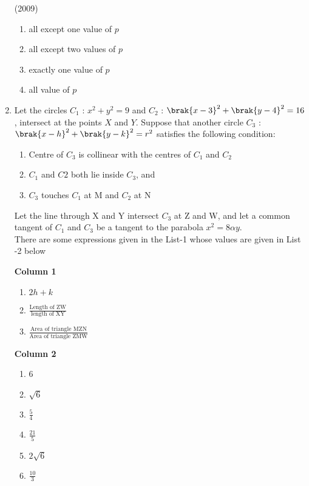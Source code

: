 \begin{enumerate}
\hfill{(2009)}
\begin{enumerate}
\item all except one value of $p$
\item all except two values of $p$
\item exactly one value of $p$
\item all value of $p$
\end{enumerate}
    \item Let the circles $C_{1}$ : $x^2+y^2=9$ and $C_{2}$ : $\brak{x-3}^2+\brak{y-4}^2 = 16$, intersect at the points $X$ and $Y$. Suppose that another circle $C_{3}$ : $\brak{x-h}^2+\brak{y-k}^2=r^2$ satisfies the following condition:\\
 
 
 \begin{enumerate}[label=(\roman*)]
 \item Centre of $C_{3}$ is collinear with the centres of $C_{1}$ and $C_{2}$
 \item $C_{1}$ and $C{2}$ both lie inside $C_{3}$, and

 \item $C_{3}$ touches $C_{1}$ at M and $C_{2}$ at N
\end{enumerate}
Let the line through X and Y intersect $C_{3}$ at Z and W, and let a common tangent of $C_{1}$ and $C_{3}$ be a tangent to the parabola $x^2=8\alpha y.$\\

There are some expressions given in the List-1 whose values are given in List -2 below
\newpage
			
\begin{multicols}{2}
\textbf{Column 1}
\begin{enumerate}[label=(\Alph*)]           
\item $2h+k$                                  
\item $\frac{\text{Length of ZW}}{\text{length of XY}}$     
\item $\frac{\text{Area of triangle MZN}}{\text{Area of triangle ZMW}}$                     
\end{enumerate}
\columnbreak
 \textbf{Column 2}
 \begin{enumerate}[label=(\alph*) , start=16]
 \item 6
 \item $\sqrt{6}$
 \item $\frac{5}{4}$                           
 \item $\frac{21}{5}$                          
 \item $2\sqrt{6}$                             
 \item $\frac{10}{3}$                         
 \end{enumerate}
\end{multicols}
		

\end{enumerate}
